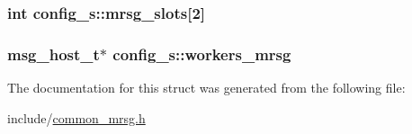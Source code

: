 \hypertarget{structconfig__s_a8ad677d8e20974b7f1cfcef8289a92e9}{
\subsubsection[{mrsg\-\_\-slots}]{\setlength{\rightskip}{0pt plus 5cm}int {\bf config\-\_\-s\-::mrsg\-\_\-slots}\mbox{[}2\mbox{]}}}\label{structconfig__s_a8ad677d8e20974b7f1cfcef8289a92e9}
\hypertarget{structconfig__s_adcea05f854b217e1d32d9901c57254d4}{
\subsubsection[{workers\-\_\-mrsg}]{\setlength{\rightskip}{0pt plus 5cm}msg\-\_\-host\-\_\-t$\ast$ {\bf config\-\_\-s\-::workers\-\_\-mrsg}}}\label{structconfig__s_adcea05f854b217e1d32d9901c57254d4}


\-The documentation for this struct was generated from the following file\-:\begin{DoxyCompactItemize}
\item 
include/\hyperlink{common__mrsg_8h}{common\-\_\-mrsg.\-h}\end{DoxyCompactItemize}
